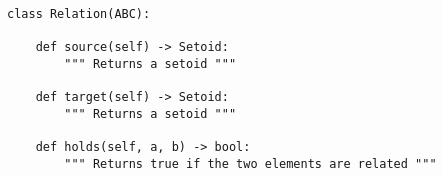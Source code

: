 \begin{verbatim}
class Relation(ABC):

    def source(self) -> Setoid:
        """ Returns a setoid """

    def target(self) -> Setoid:
        """ Returns a setoid """

    def holds(self, a, b) -> bool:
        """ Returns true if the two elements are related """
\end{verbatim}